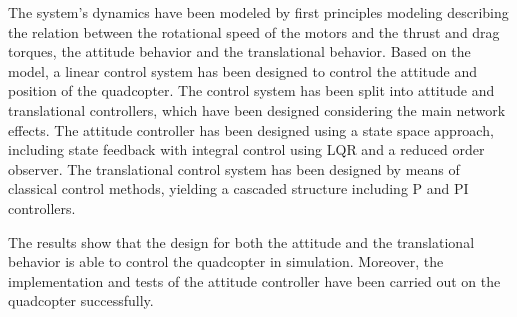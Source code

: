 The system's dynamics have been modeled by first principles modeling describing the relation between the rotational speed of the motors and the thrust and drag torques, the attitude behavior and the translational behavior. Based on the model, a linear control system has been designed to control the attitude and position of the quadcopter. The control system has been split into attitude and translational controllers, which have been designed considering the main network effects. The attitude controller has been designed using a state space approach, including state feedback with integral control using LQR and a reduced order observer. The translational control system has been designed by means of classical control methods, yielding a cascaded structure including P and PI controllers. 

The results show that the design for both the attitude and the translational behavior is able to control the quadcopter in simulation. Moreover, the implementation and tests of the attitude controller have been carried out on the quadcopter successfully. 


